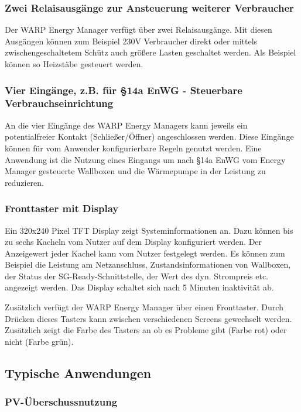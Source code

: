 \documentclass[a4paper,10pt]{article}
\begin{document}
\begin{multicols*}{2}
	\subsubsection{Zwei Relaisausgänge zur Ansteuerung weiterer Verbraucher}
	Der WARP Energy Manager verfügt über zwei Relaisausgänge.
    Mit diesen Ausgängen können zum Beispiel 230V Verbraucher direkt oder mittels zwischengeschaltetem Schütz auch größere Lasten
    geschaltet werden. Als Beispiel können so Heizstäbe gesteuert werden.

	\subsubsection{Vier Eingänge, z.B. für \S14a EnWG - Steuerbare Verbrauchseinrichtung}
    An die vier Eingänge des WARP Energy Managers kann jeweils ein potentialfreier Kontakt (Schließer/Öffner) angeschlossen werden.
    Diese Eingänge können für vom Anwender konfigurierbare Regeln genutzt werden. Eine Anwendung ist die Nutzung eines Eingangs
    um nach \S14a EnWG vom Energy Manager gesteuerte Wallboxen und die Wärmepumpe in der Leistung zu reduzieren.

    \subsubsection{Fronttaster mit Display}
    Ein 320x240 Pixel TFT Display zeigt Systeminformationen an. Dazu können bis zu sechs Kacheln vom Nutzer auf dem Display konfiguriert werden.
    Der Anzeigewert jeder Kachel kann vom Nutzer festgelegt werden. Es können zum Beispiel die Leistung am Netzanschluss,
    Zustandsinformationen von Wallboxen, der Status der SG-Ready-Schnittstelle, der Wert des dyn. Strompreis etc. angezeigt werden.
    Das Display schaltet sich nach 5 Minuten inaktivität ab.

    Zusätzlich verfügt der WARP Energy Manager über einen Fronttaster. Durch Drücken dieses Tasters kann zwischen verschiedenen Screens
    gewechselt werden. Zusätzlich zeigt die Farbe des Tasters an ob es Probleme gibt (Farbe rot) oder nicht (Farbe grün).


    \newpage

	\subsection{Typische Anwendungen}

	\subsubsection{PV-Überschussnutzung}
	\label{pv_ueberschussnutzung}


\end{multicols*}
\end{document}
